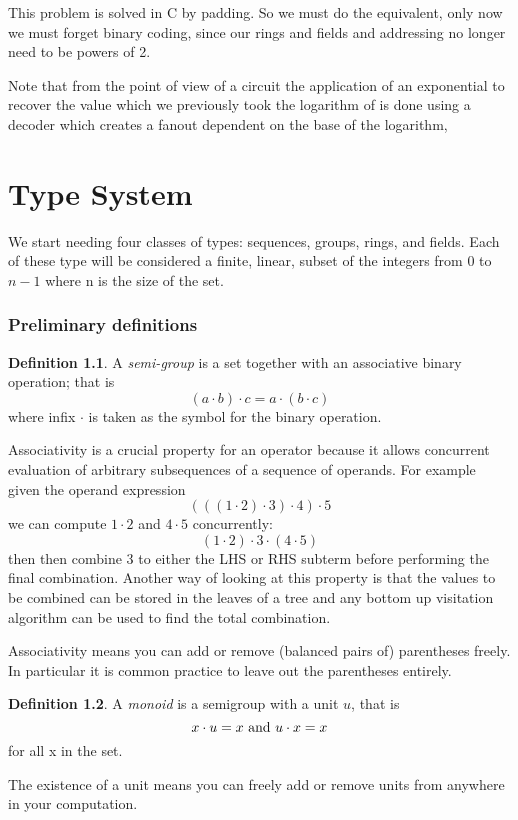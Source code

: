 \documentclass[oneside]{book}
\theoremstyle{plain}
\theoremstyle{definition}
\newtheorem{definition}{Definition}
\theoremstyle{plain}
\begin{document}
This problem is solved in C by padding. So we must do the equivalent,
only now we must forget binary coding, since our rings and fields
and addressing no longer need to be powers of 2.

Note that from the point of view of a circuit the application of an exponential
to recover the value which we previously took the logarithm of is done
using a decoder which creates a fanout dependent on the base of the logarithm,

\chapter{Type System}
We start needing four classes of types: sequences, groups, rings, and fields.
Each of these type will be considered a finite, linear, subset of the integers 
from 0 to $n-1$ where n is the size of the set.

\subsection{Preliminary definitions}
\begin{definition}
A {\em semi-group} is a set together with an associative binary operation; that is
$$(a \cdot b)\cdot c = a \cdot (b \cdot c)$$
where infix $\cdot$ is taken as the symbol for the binary operation.
\end{definition}

Associativity is a crucial property for an operator because it allows concurrent
evaluation of arbitrary subsequences of a sequence of operands. For example given
the operand expression 
$$(((1\cdot2)\cdot3)\cdot4)\cdot5$$
we can compute $1\cdot2$ and $4\cdot5$ concurrently:
$$(1\cdot2)\cdot3\cdot(4\cdot5)$$
then then combine 3 to either the LHS or RHS subterm before performing the final combination.
Another way of looking at this property is that the values to be combined can be stored in
the leaves of a tree and any bottom up visitation algorithm can be used to find the total combination.

Associativity means you can add or remove (balanced pairs of) parentheses freely.
In particular it is common practice to leave out the parentheses entirely.

\begin{definition}
A {\em monoid} is a semigroup with a unit $u$, that is
$$x\cdot u = x {\rm \ and\ }u \cdot x = x$$
for all x in the set.
\end{definition}

The existence of a unit means you can freely add or remove units from
anywhere in your computation.
\end{document}
